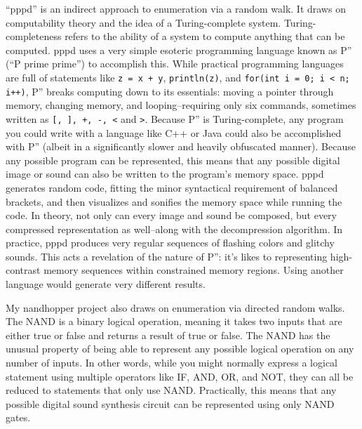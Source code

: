 \documentclass{thesis}
\begin{document}
	``pppd''\cite{kyle_mcdonald_pppd_2009} is an indirect approach to enumeration via a random walk. It draws on computability theory\cite{boolos_computability_2002} and the idea of a Turing-complete system. Turing-completeness refers to the ability of a system to compute anything that can be computed. pppd uses a very simple esoteric programming language known as P'' (``P prime prime'') to accomplish this. While practical programming languages are full of statements like \verb!z = x + y!, \verb!println(z)!, and \verb!for(int i = 0; i < n; i++)!, P'' breaks computing down to its essentials: moving a pointer through memory, changing memory, and looping--requiring only six commands, sometimes written as \verb![, ], +, -, <! and \verb!>!. Because P'' is Turing-complete, any program you could write with a language like C++ or Java could also be accomplished with P'' (albeit in a significantly slower and heavily obfuscated manner). Because any possible program can be represented, this means that any possible digital image or sound can also be written to the program's memory space. pppd generates random code, fitting the minor syntactical requirement of balanced brackets, and then visualizes and sonifies the memory space while running the code. In theory, not only can every image and sound be composed, but every compressed representation as well--along with the decompression algorithm. In practice, pppd produces very regular sequences of flashing colors and glitchy sounds. This acts a revelation of the nature of P'': it's likes to representing high-contrast memory sequences within constrained memory regions. Using another language would generate very different results.
	
	My nandhopper project\cite{kyle_mcdonald_nandhopper_2008} also draws on enumeration via directed random walks. The NAND is a binary logical operation, meaning it takes two inputs that are either true or false and returns a result of true or false. The NAND has the unusual property of being able to represent any possible logical operation on any number of inputs. In other words, while you might normally express a logical statement using multiple operators like IF, AND, OR, and NOT, they can all be reduced to statements that only use NAND. Practically, this means that any possible digital sound synthesis circuit can be represented using only NAND gates.
	
\end{document}
